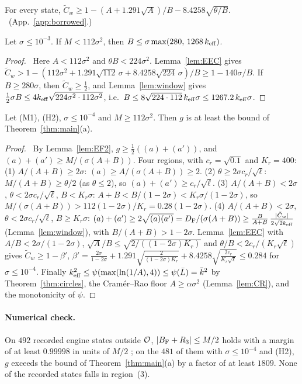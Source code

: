 \begin{lemma}\label{lem:EEC}
For every state, $\tilde C_w\ge1-(A+1.291\sqrt A)/B-8.4258\sqrt{\theta/B}$.
\proofst\ (App.~\ref{app:borrowed}.)
\end{lemma}

\begin{lemma}\label{lem:EFO}
Let $\sigma\le10^{-3}$. If $M<112\sigma^2$, then $B\le\sigma\max(280,\,1268\,k_{\mathrm{eff}})$.
\end{lemma}
\begin{proof}\proofst\
Here $A<112\sigma^2$ and $\theta B<224\sigma^2$.
Lemma~\ref{lem:EEC} gives $\tilde C_w>1-(112\sigma^2+1.291\sqrt{112}\,\sigma+8.4258\sqrt{224}\,\sigma)/B\ge1-140\sigma/B$.
If $B\ge280\sigma$, then $\tilde C_w\ge\frac12$, and Lemma~\ref{lem:window} gives $\frac12\sigma B\le4k_{\mathrm{eff}}\sqrt{224\sigma^2\cdot112\sigma^2}$, i.e.\ $B\le8\sqrt{224\cdot112}\,k_{\mathrm{eff}}\sigma\le1267.2\,k_{\mathrm{eff}}\sigma$.
\end{proof}

\begin{proposition}\label{prop:outside}
Let \textup{(M1)}, \textup{(H2)}, $\sigma\le10^{-4}$ and $M\ge112\sigma^2$. Then $g$ is at least the bound of Theorem~\ref{thm:main}(a).
\end{proposition}
\begin{proof}\proofst\
By Lemma~\ref{lem:EF2}, $g\ge\frac12((a)+(a'))$, and $(a)+(a')\ge M/(\sigma(A+B))$. Four regions, with $c_r=\sqrt{0.1}$ and $K_r=400$:
(1) $A/(A+B)\ge2\sigma$: $(a)\ge A/(\sigma(A+B))\ge2$.
(2) $\theta\ge2\sigma c_r/\sqrt\ell$: $M/(A+B)\ge\theta/2$ (as $\theta\le2$), so $(a)+(a')\ge c_r/\sqrt\ell$.
(3) $A/(A+B)<2\sigma$, $\theta<2\sigma c_r/\sqrt\ell$, $B<K_r\sigma$: $A+B<B/(1-2\sigma)<K_r\sigma/(1-2\sigma)$, so $M/(\sigma(A+B))>112(1-2\sigma)/K_r=0.28(1-2\sigma)$.
(4) $A/(A+B)<2\sigma$, $\theta<2\sigma c_r/\sqrt\ell$, $B\ge K_r\sigma$: $(a)+(a')\ge2\sqrt{(a)(a')}=D_{\rm F}/(\sigma(A+B))\ge\frac{B}{A+B}\,\frac{|\tilde C_w|}{2\sqrt2k_{\mathrm{eff}}}$ (Lemma~\ref{lem:window}), with $B/(A+B)>1-2\sigma$.
Lemma~\ref{lem:EEC} with $A/B<2\sigma/(1-2\sigma)$, $\sqrt A/B\le\sqrt{2/((1-2\sigma)K_r)}$ and $\theta/B<2c_r/(K_r\sqrt\ell)$ gives $\tilde C_w\ge1-\beta'$, $\beta'=\frac{2\sigma}{1-2\sigma}+1.291\sqrt{\frac{2}{(1-2\sigma)K_r}}+8.4258\sqrt{\frac{2c_r}{K_r\sqrt\ell}}\le0.284$ for $\sigma\le10^{-4}$.
Finally $k_{\mathrm{eff}}^2\le\psi(\max(\ln(1/A),4))\le\psi(\bar L)=\bar k^2$ by Theorem~\ref{thm:circles}, the Cram\'er--Rao floor $A\ge\alpha\sigma^2$ (Lemma~\ref{lem:CR}), and the monotonicity of $\psi$.
\end{proof}

\paragraph*{Numerical check.}
On $492$ recorded engine states outside $\mathcal O$, $|B_{\mathrm F}+R_3|\le M/2$ holds with a margin of at least $0.99998$ in units of $M/2$ \numst; on the $481$ of them with $\sigma\le10^{-4}$ and (H2), $g$ exceeds the bound of Theorem~\ref{thm:main}(a) by a factor of at least $1809$.
None of the recorded states falls in region~(3).
